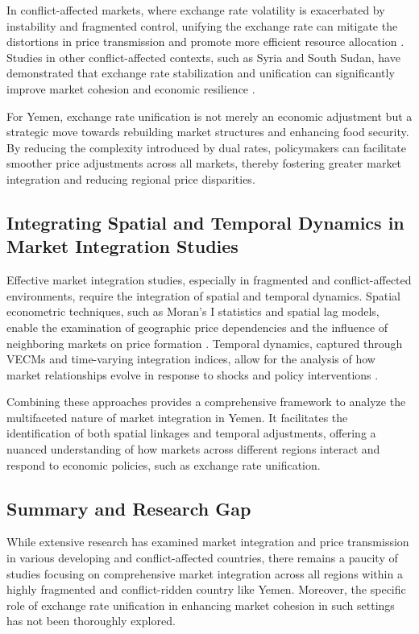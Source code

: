 In conflict-affected markets, where exchange rate volatility is exacerbated by instability and fragmented control, unifying the exchange rate can mitigate the distortions in price transmission and promote more efficient resource allocation \citep{hansen2002testing}. Studies in other conflict-affected contexts, such as Syria and South Sudan, have demonstrated that exchange rate stabilization and unification can significantly improve market cohesion and economic resilience \citep{mansour2021market}.

For Yemen, exchange rate unification is not merely an economic adjustment but a strategic move towards rebuilding market structures and enhancing food security. By reducing the complexity introduced by dual rates, policymakers can facilitate smoother price adjustments across all markets, thereby fostering greater market integration and reducing regional price disparities.

\subsection{Integrating Spatial and Temporal Dynamics in Market Integration Studies} 
Effective market integration studies, especially in fragmented and conflict-affected environments, require the integration of spatial and temporal dynamics. Spatial econometric techniques, such as Moran’s I statistics and spatial lag models, enable the examination of geographic price dependencies and the influence of neighboring markets on price formation \citep{anselin1988spatial, lesage2009}. Temporal dynamics, captured through VECMs and time-varying integration indices, allow for the analysis of how market relationships evolve in response to shocks and policy interventions \citep{hansen2002testing}.

Combining these approaches provides a comprehensive framework to analyze the multifaceted nature of market integration in Yemen. It facilitates the identification of both spatial linkages and temporal adjustments, offering a nuanced understanding of how markets across different regions interact and respond to economic policies, such as exchange rate unification.

\subsection{Summary and Research Gap} 
While extensive research has examined market integration and price transmission in various developing and conflict-affected countries, there remains a paucity of studies focusing on comprehensive market integration across all regions within a highly fragmented and conflict-ridden country like Yemen. Moreover, the specific role of exchange rate unification in enhancing market cohesion in such settings has not been thoroughly explored.

